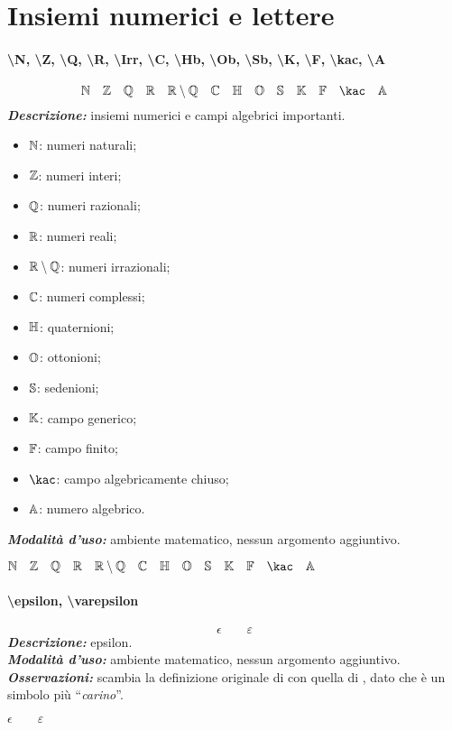 \section{Insiemi numerici e lettere}
\paragraph{\textbackslash N, \textbackslash Z, \textbackslash Q, \textbackslash R, \textbackslash Irr, \textbackslash C, \textbackslash Hb, \textbackslash Ob, \textbackslash Sb, \textbackslash K, \textbackslash F, \textbackslash kac, \textbackslash A}
\begin{equation*}
	\N\quad\Z\quad\Q\quad\R\quad\Irr\quad\C\quad\Hb\quad\Ob\quad\Sb\quad\K\quad\F\quad\kac\quad\A
\end{equation*}
\textbf{\textit{Descrizione:}} insiemi numerici e campi algebrici importanti.
\begin{multicols}{2}
	\begin{itemize}
		\item $\mathbb{N}$: numeri naturali;
		\item $\mathbb{Z}$: numeri interi;
		\item $\mathbb{Q}$: numeri razionali;
		\item $\mathbb{R}$: numeri reali;
		\item $\mathbb{R}\setminus\mathbb{Q}$: numeri irrazionali;
		\item $\mathbb{C}$: numeri complessi;
		\item $\mathbb{H}$: quaternioni;
		\item $\mathbb{O}$: ottonioni;
		\item $\mathbb{S}$: sedenioni;
		\item $\mathbb{K}$: campo generico;
		\item $\mathbb{F}$: campo finito;
		\item $\kac$: campo algebricamente chiuso;
		\item $\mathbb{A}$: numero algebrico.
	\end{itemize}
\end{multicols}
\noindent\textbf{\textit{Modalità d'uso:}} ambiente matematico, nessun argomento aggiuntivo.
\begin{codelatex}
$\N\quad\Z\quad\Q\quad\R\quad\Irr\quad\C\quad\Hb\quad\Ob\quad\Sb\quad\K\quad\F\quad\kac\quad\A$
\end{codelatex}
\paragraph{\textbackslash epsilon, \textbackslash varepsilon}
\begin{equation*}
	\epsilon\qquad\varepsilon
\end{equation*}
\textbf{\textit{Descrizione:}} epsilon.\\
\textbf{\textit{Modalità d'uso:}} ambiente matematico, nessun argomento aggiuntivo.\\
\textbf{\textit{Osservazioni:}} scambia la definizione originale di  con quella di , dato che è un simbolo più ``\textit{carino}''.
\begin{codelatex}
$\epsilon\qquad\varepsilon$
\end{codelatex}
